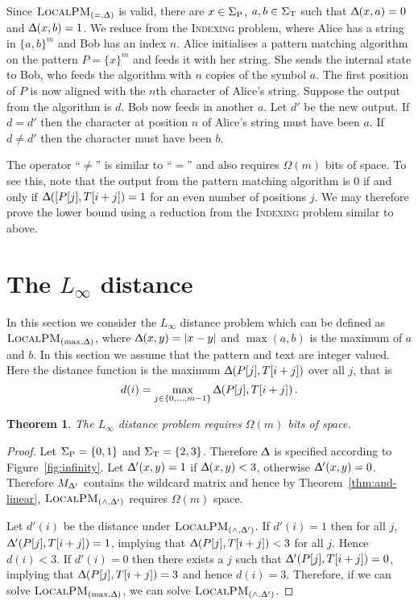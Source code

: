\documentclass{article}
\renewcommand{\Delta}{\Updelta}
\newcommand{\indexing}{\textsc{Indexing}\xspace}
\newcommand{\SigmaP}{\ensuremath{\Sigma_{\textup{P}}}}
\newcommand{\SigmaT}{\ensuremath{\Sigma_{\textup{T}}}}
\newcommand{\local}{\ensuremath{\textsc{LocalPM}}}
\theoremstyle{plain}
\newtheorem{theorem}{Theorem}[]
\theoremstyle{definition}
\begin{document}
Since $\local_{(=,\Delta)}$ is valid, there are $x\in\SigmaP$, $a,b\in\SigmaT$ such that $\Delta(x,a)=0$ and $\Delta(x,b)=1$. We reduce from the \indexing problem, where Alice has a string in $\{a,b\}^m$ and Bob has an index $n$. Alice initialises a pattern matching algorithm on the pattern $P=\{x\}^m$ and feeds it with her string. She sends the internal state to Bob, who feeds the algorithm with $n$ copies of the symbol $a$. The first position of $P$ is now aligned with the $n$th character of Alice's string. Suppose the output from the algorithm is $d$. Bob now feeds in another $a$. Let $d'$ be the new output. If $d=d'$ then the character at position $n$ of Alice's string must have been $a$. If $d\neq d'$ then the character must have been $b$.

The operator ``$\neq$'' is similar to ``$=$'' and also requires $\Omega(m)$ bits of space. To see this, note that the output from the pattern matching algorithm is 0 if and only if $\Delta([P[j],T[i+j])=1$ for an even number of positions $j$. We may therefore prove the lower bound using a reduction from the \indexing problem similar to above.


\section{The $L_{\infty}$ distance}\label{sec:infty}

In this section we consider the $L_{\infty}$ distance problem which can be defined as $\local_{(\max,\Delta)}$, where $\Delta(x,y)=|x-y|$ and $\max(a,b)$ is the maximum of $a$ and $b$. In this section we assume that the pattern and text are integer valued. Here the distance function is the maximum $\Delta(P[j],T[i+j])$ over all $j$, that is
\begin{equation*}
    d(i)= \max_{j\in\{0,\dots,m-1\}} \Delta(P[j],T[i+j])\,.
\end{equation*}

\begin{theorem}
    \label{thm:maximum}
    The $L_{\infty}$ distance problem requires $\Omega(m)$ bits of space.
\end{theorem}
\begin{proof}
    Let $\SigmaP=\{0,1\}$ and $\SigmaT=\{2,3\}$. Therefore $\Delta$ is specified according to Figure~\ref{fig:infinity}. Let $\Delta'(x,y)=1$ if $\Delta(x,y)<3$,
    otherwise $\Delta'(x,y)=0$. Therefore $M_{\Delta'}$ contains the wildcard
    matrix and hence by Theorem~\ref{thm:and-linear}, $\local_{(\wedge,\Delta')}$ requires $\Omega(m)$ space.

    Let $d'(i)$ be the distance under $\local_{(\wedge,\Delta')}$. If $d'(i)=1$ then for all $j$, $\Delta'(P[j],T[i+j])=1$, implying that $\Delta(P[j],T[i+j])<3$ for all $j$. Hence $d(i)<3$. If $d'(i)=0$ then there exists a $j$ such that $\Delta'(P[j],T[i+j])=0$, implying that $\Delta(P[j],T[i+j])=3$ and hence $d(i)=3$. Therefore, if we can solve $\local_{(\max,\Delta)}$, we can solve $\local_{(\wedge,\Delta')}$.
\end{proof}
\end{document}
